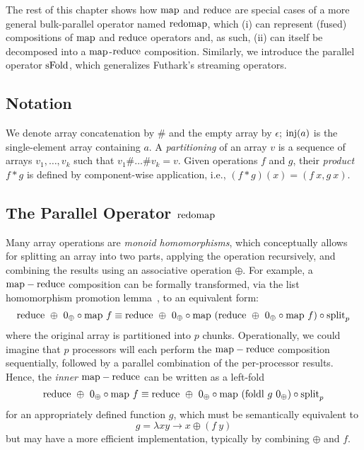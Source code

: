
The rest of this chapter shows how $\mathrm{map}{}$ and $\mathrm{reduce}{}$ are
special cases of a more general bulk-parallel operator named
$\mathrm{redomap}{}$, which (i) can represent (fused) compositions of
$\mathrm{map}{}$ and $\mathrm{reduce}{}$ operators and, as such, (ii) can itself be
decomposed into a $\mathrm{map}{}$-$\mathrm{reduce}{}$ composition.  Similarly, we
introduce the parallel operator $\mathrm{sFold}{}$, which generalizes
Futhark's streaming operators.

\subsection{Notation}

We denote array concatenation by $\#$ and the empty array by $\epsilon$;
$\mathrm{inj}(a)$ is the single-element array containing $a$.
A \emph{partitioning} of an array $v$ is a sequence of arrays $v_1, \ldots, v_k$ such
that $v_1 \# \ldots \# v_k = v$.
%
Given operations $f$ and $g$, their \emph{product} $f * g$ is defined
by component-wise application, i.e., $(f * g) (x) = (f~x, g~x)$.
%
%

\subsection{The Parallel Operator $\mathrm{redomap}$}
\label{sec:formal-redomap}

Many array operations are \emph{monoid homomorphisms}, which
conceptually allows for splitting an array into two parts, applying
the operation recursively, and combining the results using an
associative operation $\oplus$.  For example, a $\mathrm{map}-\mathrm{reduce}$
composition can be formally transformed, via the list homomorphism
promotion lemma~\cite{BirdListTh}, to an equivalent form:
\[
  \mathrm{reduce}~\oplus~0_{\oplus} \circ \mathrm{map}~f \equiv \mathrm{reduce}~\oplus~0_{\oplus} \circ \mathrm{map}~(\mathrm{reduce}~\oplus~0_{\oplus} \circ \mathrm{map}~f) \circ \textrm{split}_{p}
\]
where the original array is partitioned into $p$ chunks.
Operationally, we could imagine that $p$ processors will each perform
the $\mathrm{map}-\mathrm{reduce}$ composition sequentially, followed by a parallel
combination of the per-processor results.  Hence, the \textit{inner}
$\mathrm{map}-\mathrm{reduce}$ can be written as a left-fold
\[
  \mathrm{reduce}~\oplus~0_{\oplus} \circ \mathrm{map}~f \equiv \mathrm{reduce}~\oplus~0_{\oplus} \circ \mathrm{map}~(\mathrm{foldl}~g~0_{\oplus}) \circ \textrm{split}_{p}
\]
for an appropriately defined function $g$, which must be semantically
equivalent to
\[
  g = \lambda x y \rightarrow x \oplus (f~y)
\]
but may have a more efficient implementation, typically by combining
$\oplus$ and $f$.

